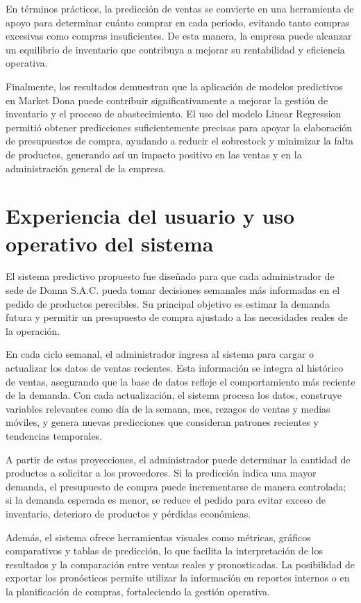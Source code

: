En términos prácticos, la predicción de ventas se convierte en una herramienta de apoyo para determinar cuánto comprar en cada periodo, evitando tanto compras excesivas como compras insuficientes. De esta manera, la empresa puede alcanzar un equilibrio de inventario que contribuya a mejorar su rentabilidad y eficiencia operativa.

Finalmente, los resultados demuestran que la aplicación de modelos predictivos en Market Dona puede contribuir significativamente a mejorar la gestión de inventario y el proceso de abastecimiento. El uso del modelo Linear Regression permitió obtener predicciones suficientemente precisas para apoyar la elaboración de presupuestos de compra, ayudando a reducir el sobrestock y minimizar la falta de productos, generando así un impacto positivo en las ventas y en la administración general de la empresa.

\section{Experiencia del usuario y uso operativo del sistema}

El sistema predictivo propuesto fue diseñado para que cada administrador de sede de Donna S.A.C. pueda tomar decisiones semanales más informadas en el pedido de productos perecibles. Su principal objetivo es estimar la demanda futura y permitir un presupuesto de compra ajustado a las necesidades reales de la operación.

En cada ciclo semanal, el administrador ingresa al sistema para cargar o actualizar los datos de ventas recientes. Esta información se integra al histórico de ventas, asegurando que la base de datos refleje el comportamiento más reciente de la demanda. Con cada actualización, el sistema procesa los datos, construye variables relevantes como día de la semana, mes, rezagos de ventas y medias móviles, y genera nuevas predicciones que consideran patrones recientes y tendencias temporales.

A partir de estas proyecciones, el administrador puede determinar la cantidad de productos a solicitar a los proveedores. Si la predicción indica una mayor demanda, el presupuesto de compra puede incrementarse de manera controlada; si la demanda esperada es menor, se reduce el pedido para evitar exceso de inventario, deterioro de productos y pérdidas económicas.

Además, el sistema ofrece herramientas visuales como métricas, gráficos comparativos y tablas de predicción, lo que facilita la interpretación de los resultados y la comparación entre ventas reales y pronosticadas. La posibilidad de exportar los pronósticos permite utilizar la información en reportes internos o en la planificación de compras, fortaleciendo la gestión operativa.

